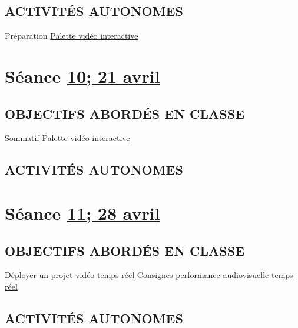 \documentclass[
]{book}
\begin{document}
\hypertarget{activituxe9s-autonomes-10}{%
\subsection{ACTIVITÉS AUTONOMES}\label{activituxe9s-autonomes-10}}

Préparation \protect\hyperlink{sommatif_4}{Palette vidéo interactive}

\hypertarget{semaine_12}{%
\section{\texorpdfstring{Séance \protect\hyperlink{semaine_12}{10; 21 avril}}{Séance 10; 21 avril}}\label{semaine_12}}

\hypertarget{objectifs-aborduxe9s-en-classe-11}{%
\subsection{OBJECTIFS ABORDÉS EN CLASSE}\label{objectifs-aborduxe9s-en-classe-11}}

Sommatif \protect\hyperlink{sommatif_4}{Palette vidéo interactive}

\hypertarget{activituxe9s-autonomes-11}{%
\subsection{ACTIVITÉS AUTONOMES}\label{activituxe9s-autonomes-11}}

\hypertarget{semaine_13}{%
\section{\texorpdfstring{Séance \protect\hyperlink{semaine_13}{11; 28 avril}}{Séance 11; 28 avril}}\label{semaine_13}}

\hypertarget{objectifs-aborduxe9s-en-classe-12}{%
\subsection{OBJECTIFS ABORDÉS EN CLASSE}\label{objectifs-aborduxe9s-en-classe-12}}

\protect\hyperlink{deployer}{Déployer un projet vidéo temps réel}
Consignes \protect\hyperlink{sommatif_5}{performance audiovisuelle temps réel}

\hypertarget{activituxe9s-autonomes-12}{%
\subsection{ACTIVITÉS AUTONOMES}\label{activituxe9s-autonomes-12}}
\end{document}
